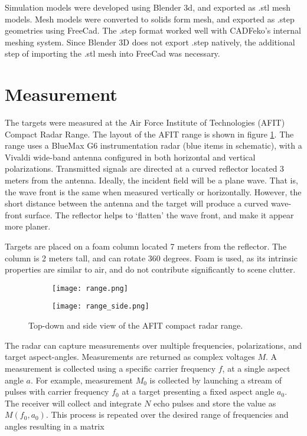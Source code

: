   Simulation models were developed using Blender 3d, and exported as .stl mesh models. Mesh models were converted to solids form mesh, and exported as .step geometries using FreeCad. The .step format worked well with CADFeko's internal meshing system. Since Blender 3D does not export .step natively, the additional step of importing the .stl mesh into FreeCad was necessary.

\section{Measurement}
  The targets were measured at the Air Force Institute of Technologies (AFIT) Compact Radar Range. The layout of the AFIT range is shown in figure \ref{fig:range}. The range uses a BlueMax G6 instrumentation radar (blue items in schematic), with a Vivaldi wide-band antenna configured in both horizontal and vertical polarizations. Transmitted signals are directed at a curved reflector located 3 meters from the antenna. Ideally, the incident field will be a plane wave. That is, the wave front is the same when measured vertically or horizontally. However, the short distance between the antenna and the target will produce a curved wave-front surface. The reflector helps to `flatten' the wave front, and make it appear more planer.

  Targets are placed on a foam column located 7 meters from the reflector. The column is 2 meters tall, and can rotate 360 degrees. Foam is used, as its intrinsic properties are similar to air, and do not contribute significantly to scene clutter.

  \begin{figure}[htbp]
    \centering
    \begin{subfigure}{.8\textwidth}
      \centering
      \texttt{[image: range.png]}
    \end{subfigure}%
    \begin{subfigure}{.8\textwidth}
      \centering
      \texttt{[image: range\_side.png]}
    \end{subfigure}
    \caption[AFIT Compact Range Schematic]{Top-down and side view of the AFIT compact radar range.}
    \label{fig:range}
  \end{figure}

  The radar can capture measurements over multiple frequencies, polarizations, and target aspect-angles. Measurements are returned as complex voltages $M$. A measurement is collected using a specific carrier frequency $f$, at a single aspect angle $a$. For example, measurement $M_0$ is collected by launching a stream of pulses with carrier frequency $f_0$ at a target presenting a fixed aspect angle $a_0$. The receiver will collect and integrate $N$ echo pulses and store the value as $M(f_0, a_0)$. This process is repeated over the desired range of frequencies and angles resulting in a matrix

